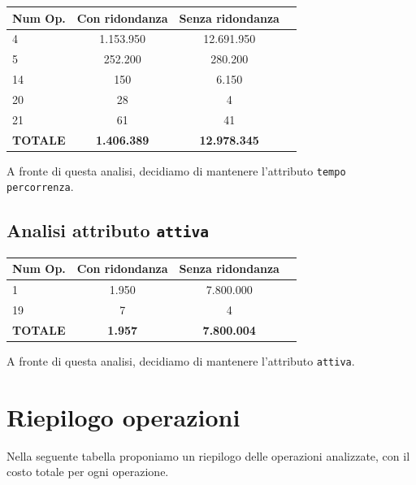 \documentclass[12pt,a4paper]{report}
\begin{document}
\begin{table}[H]
	\centering
	\begin{tabular}{|l|c|c|c|}
	\hline
	\textbf{Num Op.} & \textbf{Con ridondanza} & \textbf{Senza ridondanza} \\
	\hline
	4 & 1.153.950 & 12.691.950 \\
  \hline
	5 & 252.200 & 280.200 \\
  \hline
  14 & 150 & 6.150 \\
  \hline
  20 & 28 & 4 \\
  \hline
  21 & 61 & 41 \\
  \hline
  \textbf{TOTALE} & \textbf{1.406.389} & \textbf{12.978.345} \\
  \hline
  \end{tabular}
\end{table}

A fronte di questa analisi, decidiamo di mantenere l'attributo \texttt{tempo percorrenza}.

\subsection{Analisi attributo \texttt{attiva}}

  \begin{table}[H]
  \centering
  \begin{tabular}{|l|c|c|c|}
  \hline
  \textbf{Num Op.} & \textbf{Con ridondanza} & \textbf{Senza ridondanza} \\
  \hline
  1 & 1.950 & 7.800.000 \\
  \hline
  19 & 7 & 4 \\
  \hline
  \textbf{TOTALE} & \textbf{1.957} & \textbf{7.800.004} \\
  \hline
  \end{tabular}
\end{table}

A fronte di questa analisi, decidiamo di mantenere l'attributo \texttt{attiva}.

\section{Riepilogo operazioni}
Nella seguente tabella proponiamo un riepilogo delle operazioni analizzate, con il costo totale per ogni operazione.
\end{document}
